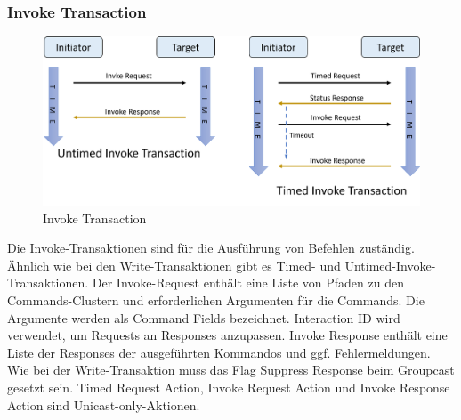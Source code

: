 \documentclass[12pt, a4paper]{article}
\begin{document}
\subsubsection{Invoke Transaction}
\begin{figure}[h]
  \centering
  \includegraphics[scale=0.5]{invoke}
  \caption{Invoke Transaction}
  \label{Invoke Transaction}
\end{figure}
\par Die Invoke-Transaktionen sind für die Ausführung von Befehlen zuständig. Ähnlich wie bei den Write-Transaktionen gibt es Timed- und Untimed-Invoke-Transaktionen. Der Invoke-Request enthält eine Liste von Pfaden zu den Commands-Clustern und erforderlichen Argumenten für die Commands. Die Argumente werden als Command Fields bezeichnet. Interaction ID wird verwendet, um Requests an Responses anzupassen. Invoke Response enthält eine Liste der Responses der ausgeführten Kommandos und ggf. Fehlermeldungen. Wie bei der Write-Transaktion muss das Flag Suppress Response beim Groupcast gesetzt sein. Timed Request Action, Invoke Request Action und Invoke Response Action sind Unicast-only-Aktionen.
\end{document}
